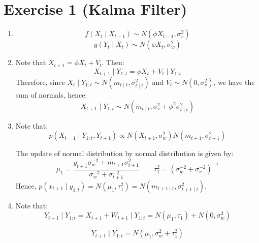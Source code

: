 \documentclass[12pt,letterpaper]{article}
\begin{document}

\section*{Exercise 1 (Kalma Filter)}
\begin{enumerate}[leftmargin=!,labelindent=5pt]
\item 
$$
f(X_t \mid X_{t-1}) \sim N(\phi X_{t-1}, \sigma_v^2)
$$
$$
g(Y_t \mid X_{t}) \sim N(\phi X_{t}, \sigma_w^2)
$$

\item Note that $X_{t+1} = \phi X_t + V_t$. Then:
$$
X_{t+1} \mid Y_{1:t} = \phi X_t + V_t \mid Y_{1:t}
$$
Therefore, since
$X_t \mid Y_{1:t} \sim N(m_{t\mid t}, \sigma^2_{t\mid t})$ and
$V_t \sim N(0, \sigma_v^2)$, we have the sum of normals, hence:
$$
X_{t+1} \mid Y_{1:t} \sim N(m_{t\mid t}, \sigma_v^2 +
\phi^2 \sigma^2_{t\mid t})
$$

\item Note that:
$$
p(X_{t=1} \mid Y_{1:t},Y_{t+1}) \propto
N(X_{t+1},\sigma_w^2)N(m_{t+1}, \sigma_{t+1}^2)
$$

The update of normal distribution by normal distribution is given by:
$$
\mu_1 = \frac{y_{t+1}\sigma_w ^{-2} + m_{t+1}\sigma_{t+1}^2}
{\sigma_w^{-2} + \sigma_{t+1}^{-2}}
\quad \quad
\tau_1^2 = (\sigma_w^{-2}+\sigma_v^{-2})^{-1}
$$
Hence, $p(x_{t+1} \mid y_{1:t}) = N(\mu_1, \tau_1^2) =
N(m_{t+1\mid t},\sigma^2_{t+1 \mid t})$.

\item Note that:
$$
Y_{t+1} \mid Y_{1:t} = X_{t+1} + W_{t+1} \mid Y_{1:t} =
N(\mu_1,\tau_1) + N(0, \sigma_w ^2)
$$

$$
Y_{t+1} \mid Y_{1:t} = N(\mu_1,
\sigma_w^2 + \tau_1^2)
$$

\end{enumerate}

\newpage
\end{document}
